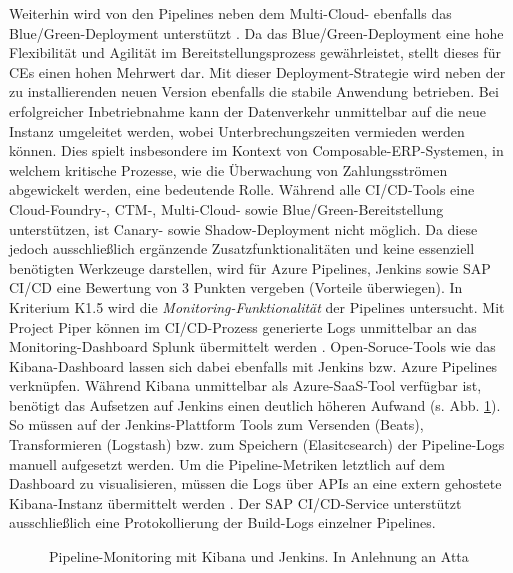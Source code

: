 Weiterhin wird von den Pipelines neben dem Multi-Cloud- ebenfalls das Blue/Green-Deployment unterstützt \cite{.20230406c}. Da das Blue/Green-Deployment eine hohe Flexibilität und Agilität im Bereitstellungsprozess gewährleistet, stellt dieses für CEs einen hohen Mehrwert dar. Mit dieser Deployment-Strategie wird neben der zu installierenden neuen Version ebenfalls die stabile Anwendung betrieben. Bei erfolgreicher Inbetriebnahme kann der Datenverkehr unmittelbar auf die neue Instanz umgeleitet werden, wobei Unterbrechungszeiten vermieden werden können. Dies spielt insbesondere im Kontext von Composable-ERP-Systemen, in welchem kritische Prozesse, wie die Überwachung von Zahlungsströmen abgewickelt werden, eine bedeutende Rolle. Während alle CI/CD-Tools eine Cloud-Foundry-, CTM-, Multi-Cloud- sowie Blue/Green-Bereitstellung unterstützen, ist Canary- sowie Shadow-Deployment nicht möglich. Da diese jedoch ausschließlich ergänzende Zusatzfunktionalitäten und keine essenziell benötigten Werkzeuge darstellen, wird für Azure Pipelines, Jenkins sowie SAP CI/CD eine Bewertung von 3 Punkten vergeben (Vorteile überwiegen). In Kriterium K1.5 wird die \textit{Monitoring-Funktionalität} der Pipelines untersucht. Mit Project Piper können im CI/CD-Prozess generierte Logs unmittelbar an das Monitoring-Dashboard Splunk übermittelt werden \cite[Z. 74 ff.]{ProductManagerSAPHyperspaceCICD.}. Open-Soruce-Tools wie das Kibana-Dashboard lassen sich dabei ebenfalls mit Jenkins bzw. Azure Pipelines verknüpfen. Während Kibana unmittelbar als Azure-SaaS-Tool verfügbar ist, benötigt das Aufsetzen auf Jenkins einen deutlich höheren Aufwand (s. Abb. \ref{fig:kibana}). So müssen auf der Jenkins-Plattform Tools zum Versenden (Beats), Transformieren (Logstash) bzw. zum Speichern (Elasitcsearch) der Pipeline-Logs manuell aufgesetzt werden. Um die Pipeline-Metriken letztlich auf dem Dashboard zu visualisieren, müssen die Logs über APIs an eine extern gehostete Kibana-Instanz übermittelt werden \cite{Atta.20201012}. Der SAP CI/CD-Service unterstützt ausschließlich eine Protokollierung der Build-Logs einzelner Pipelines.
\begin{center}
	\begin{figure}[H]
		\centering
		\caption[Pipeline-Monitoring mit Kibana und Jenkins]{Pipeline-Monitoring mit Kibana und Jenkins. In Anlehnung an Atta \cite{Atta.20201012}}
		\label{fig:kibana}
	\end{figure}
\end{center}
\vspace*{-15mm}
